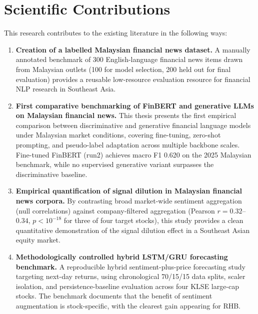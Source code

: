 \documentclass[12pt]{ucetd}
\begin{document}
\section{Scientific Contributions}


This research contributes to the existing literature in the following ways:

\begin{enumerate}
    \item \textbf{Creation of a labelled Malaysian financial news dataset.} A manually annotated benchmark of 300 English-language financial news items drawn from Malaysian outlets (100 for model selection, 200 held out for final evaluation) provides a reusable low-resource evaluation resource for financial NLP research in Southeast Asia.

    \item \textbf{First comparative benchmarking of FinBERT and generative LLMs on Malaysian financial news.} This thesis presents the first empirical comparison between discriminative and generative financial language models under Malaysian market conditions, covering fine-tuning, zero-shot prompting, and pseudo-label adaptation across multiple backbone scales. Fine-tuned FinBERT (run2) achieves macro F1 0.620 on the 2025 Malaysian benchmark, while no supervised generative variant surpasses the discriminative baseline.

    \item \textbf{Empirical quantification of signal dilution in Malaysian financial news corpora.} By contrasting broad market-wide sentiment aggregation (null correlations) against company-filtered aggregation (Pearson $r = 0.32$--$0.34$, $p < 10^{-18}$ for three of four target stocks), this study provides a clean quantitative demonstration of the signal dilution effect in a Southeast Asian equity market.

    \item \textbf{Methodologically controlled hybrid LSTM/GRU forecasting benchmark.} A reproducible hybrid sentiment-plus-price forecasting study targeting next-day returns, using chronological 70/15/15 data splits, scaler isolation, and persistence-baseline evaluation across four KLSE large-cap stocks. The benchmark documents that the benefit of sentiment augmentation is stock-specific, with the clearest gain appearing for RHB.
\end{enumerate}
\end{document}

